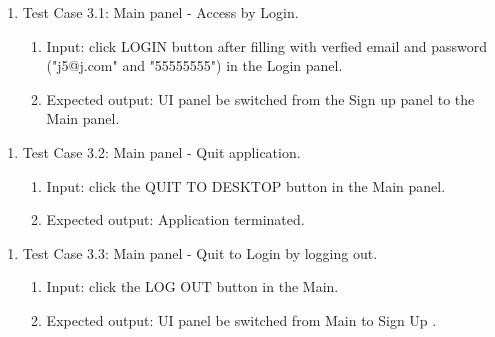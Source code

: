 \documentclass[11pt]{article}
\begin{document}
    \begin{enumerate}
        \item Test Case 3.1: Main panel - Access by Login.
        \begin{enumerate}
            \item  Input: click LOGIN button after filling with verfied email and password ("j5@j.com" and "55555555") in the Login panel.
            \item  Expected output: UI panel be switched from the Sign up panel to the Main panel.
        \end{enumerate}
    \end{enumerate}
    \begin{enumerate}
        \item Test Case 3.2: Main panel - Quit application.
        \begin{enumerate}
            \item  Input: click the QUIT TO DESKTOP button in the Main panel.
            \item  Expected output: Application terminated.
        \end{enumerate}
    \end{enumerate}
    \begin{enumerate}
        \item Test Case 3.3: Main panel - Quit to Login by logging out.
        \begin{enumerate}
            \item  Input: click the LOG OUT button in the Main.
            \item  Expected output: UI panel be switched from Main to Sign Up .
        \end{enumerate}
    \end{enumerate}
\end{document}
